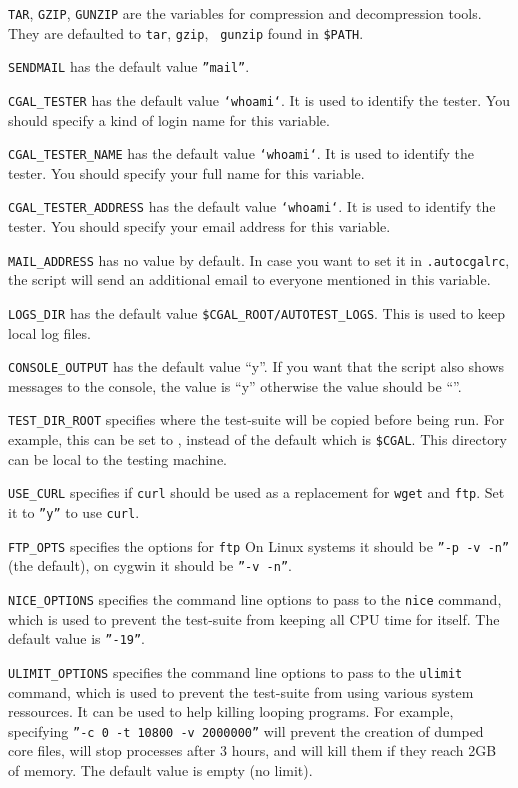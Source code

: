 {\tt TAR}, {\tt GZIP}, {\tt GUNZIP} are the variables for compression and
decompression tools.  They are defaulted to {\tt tar}, {\tt gzip}, {\tt
gunzip} found in {\tt \$PATH}.

{\tt SENDMAIL} has the default value {\tt ''mail''}.

{\tt CGAL\_TESTER} has the default value {\tt `whoami`}.  It is used to
identify the tester.  You should specify a kind of login name for this
variable.

{\tt CGAL\_TESTER\_NAME} has the default value {\tt `whoami`}.  It is used to
identify the tester.  You should specify your full name for this variable.

{\tt CGAL\_TESTER\_ADDRESS} has the default value {\tt `whoami`}.  It is used
to identify the tester.  You should specify your email address for this
variable.

{\tt MAIL\_ADDRESS} has no value by default. In case you want to
set it in {\tt .autocgalrc}, the script will send an additional email to
everyone mentioned in this variable.

{\tt LOGS\_DIR} has the default value {\tt \$CGAL\_ROOT/AUTOTEST\_LOGS}.  This
is used to keep local log files.

{\tt CONSOLE\_OUTPUT} has the default value ``y''. If you want that the script
 also shows messages to the console, the value is ``y'' otherwise the value
should be ``''.

{\tt TEST\_DIR\_ROOT} specifies where the test-suite will be copied before
being run.  For example, this can be set to , instead of the default
which is {\tt \$CGAL}.  This directory can be local to the testing machine.

{\tt USE\_CURL} specifies if {\tt curl} should be used as a replacement for
{\tt wget} and {\tt ftp}.  Set it to {\tt ''y''} to use {\tt curl}.

{\tt FTP\_OPTS} specifies the options for {\tt ftp}   On Linux systems 
it should be {\tt ''-p -v -n''} (the default), on cygwin it should be {\tt ''-v -n''}.

{\tt NICE\_OPTIONS} specifies the command line options to pass to the
{\tt nice} command, which is used to prevent the test-suite from keeping
all CPU time for itself.  The default value is {\tt ''-19''}.

{\tt ULIMIT\_OPTIONS} specifies the command line options to pass to the
{\tt ulimit} command, which is used to prevent the test-suite from using
various system ressources.  It can be used to help killing looping programs.
For example, specifying {\tt ''-c 0 -t 10800 -v 2000000''} will prevent
the creation of dumped core files, will stop processes after 3 hours,
and will kill them if they reach 2GB of memory.
The default value is empty (no limit).

